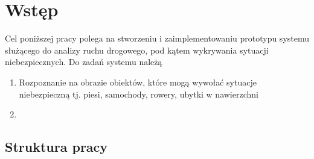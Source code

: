 \chapter{Wstęp}

Cel poniższej pracy polega na stworzeniu i zaimplementowaniu prototypu systemu służącego do analizy ruchu drogowego, pod kątem wykrywania sytuacji niebezpiecznych. Do zadań systemu należą

\begin{enumerate}
    \item Rozpoznanie na obrazie obiektów, które mogą wywołać sytuacje niebezpieczną tj. piesi, samochody, rowery, ubytki w nawierzchni
    \item 
\end{enumerate}

\section{Struktura pracy}





